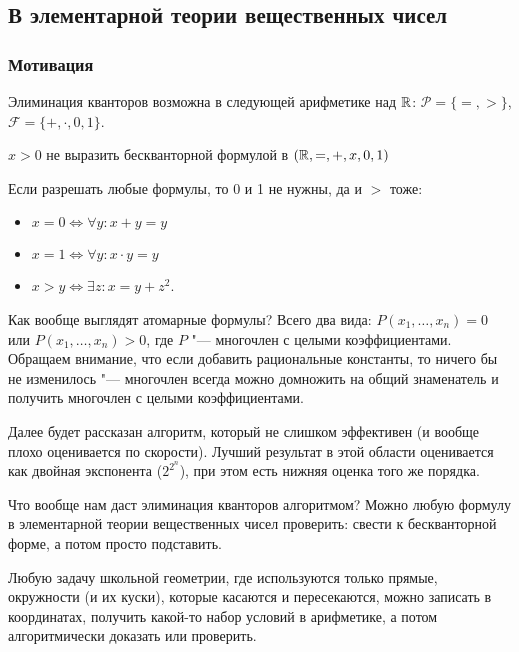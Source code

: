 \subsection{В элементарной теории вещественных чисел}

\subsubsection{Мотивация}
	\begin{assertion}
		Элиминация кванторов возможна в следующей арифметике над $\mathbb{R}$:
		$\mathcal P = \{=, >\}$, $\mathcal F = \{+, \cdot, 0, 1\}$.
	\end{assertion}
	\begin{Rem}
		$x > 0$ не выразить бескванторной формулой в $(\mathbb{R}, =, +, x, 0, 1)$
	\end{Rem}
	\begin{Rem}
		Если разрешать любые формулы, то 0 и 1 не нужны, да и $>$ тоже:
		\begin{itemize}
		\item $x = 0 \iff \forall y \colon x + y = y$
		\item $x = 1 \iff \forall y \colon x \cdot y = y$
		\item $x > y \iff \exists z \colon x = y + z ^ 2$.
		\end{itemize}
	\end{Rem}

	Как вообще выглядят атомарные формулы?
	Всего два вида: $P(x_1, \dots, x_n)=0$ или $P(x_1, \dots, x_n) > 0$, где $P$ "--- многочлен с целыми коэффициентами.
	Обращаем внимание, что если добавить рациональные константы, то ничего бы не изменилось "--- многочлен всегда можно домножить на общий знаменатель
	и получить многочлен с целыми коэффициентами.

	Далее будет рассказан алгоритм, который не слишком эффективен (и вообще плохо оценивается по скорости).
	Лучший результат в этой области оценивается как двойная экспонента ($2^{2^n}$), при этом есть нижняя оценка того же порядка.

	Что вообще нам даст элиминация кванторов алгоритмом?
	Можно любую формулу в элементарной теории вещественных чисел проверить: свести к бескванторной форме, а потом просто подставить.

	\begin{exmp}
	Любую задачу школьной геометрии, где используются только прямые, окружности (и их куски),
	которые касаются и пересекаются, можно записать в координатах, получить какой-то набор условий
	в арифметике, а потом алгоритмически доказать или проверить.
	\end{exmp}

